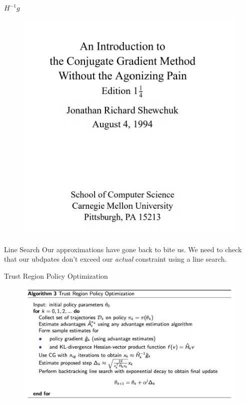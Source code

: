 \documentclass{beamer}
\begin{document}
\begin{frame}{$H^{-1}g$}
\label{done_deriv}

\begin{figure}
    \centering
    \includegraphics[width=1.1\linewidth]{trpo_funny_reference.png}
    \label{fig:joke}
\end{figure}    
\end{frame}

\begin{frame}{Line Search}
    Our approximations have gone back to bite us. We need to check that our ubdpates don't exceed our \textit{actual} constraint using a line search. 
\end{frame}


\begin{frame}{Trust Region Policy Optimization}
    
    \begin{figure}
        \centering
        \includegraphics[width=1\linewidth]{trpo_algorithm_pseudocode.png}
        \label{fig:algo_pseudocode}
    \end{figure}    

    
\end{frame}
\end{document}
